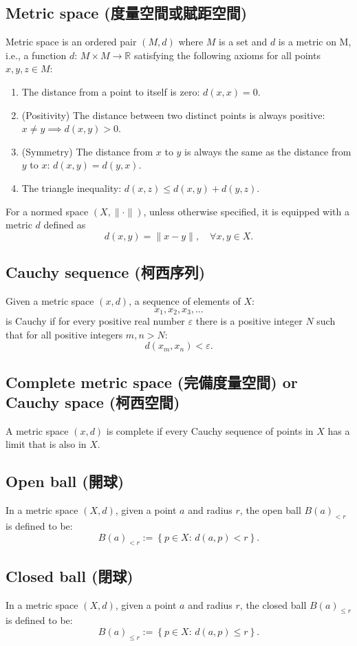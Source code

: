 \documentclass[a4paper,12pt]{article}
\begin{document}
\subsection{Metric space (度量空間或賦距空間)}
Metric space is an ordered pair $(M, d)$ where $M$ is a set and $d$ is a metric on M, i.e., a function $d:\,M\times M\to\mathbb{R}$ satisfying the following axioms for all points $x,y,z\in M$:
\begin{enumerate}
\item The distance from a point to itself is zero: $d(x,x)=0$.
\item (Positivity) The distance between two distinct points is always positive:$x\neq y\implies d(x,y)>0$.
\item (Symmetry) The distance from $x$ to $y$ is always the same as the distance from $y$ to $x$: $d(x,y)=d(y,x)$.
\item The triangle inequality: $d(x,z)\leq d(x,y)+d(y,z)$.
\end{enumerate}

For a normed space $(X,\|\cdot\|)$, unless otherwise specified, it is equipped with a metric $d$ defined as
\[d(x,y)=\|x-y\|,\quad \forall x,y\in X.\]
\subsection{Cauchy sequence (柯西序列)}
Given a metric space $(x,d)$, a sequence of elements of $X$:
\[x_1,x_2,x_3,\ldots\]
is Cauchy if for every positive real number $\varepsilon$ there is a positive integer $N$ such that for all positive integers $m,n>N$:
\[d\left(x_m,x_n\right)<\varepsilon.\]
\subsection{Complete metric space (完備度量空間) or Cauchy space (柯西空間)}
A metric space $(x,d)$ is complete if every Cauchy sequence of points in $X$ has a limit that is also in $X$.
\subsection{Open ball (開球)}
In a metric space $(X,d)$, given a point $a$ and radius $r$, the open ball $B(a)_{<r}$ is defined to be:
\[B(a)_{<r}:=\left\{p\in X:\, d(a,p)<r\right\}.\]
\subsection{Closed ball (閉球)}
In a metric space $(X,d)$, given a point $a$ and radius $r$, the closed ball $B(a)_{\leq r}$ is defined to be:
\[B(a)_{\leq r}:=\left\{p\in X:\, d(a,p)\leq r\right\}.\]
\end{document}
